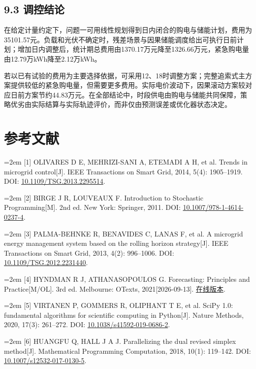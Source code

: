 \documentclass[UTF8,a4paper,zihao=-4,fontset=windows]{ctexart}
\begin{document}
\subsection{9.3 调控结论}
在给定计量约定下，问题一可用线性规划得到日内闭合的购电与储能计划，费用为35101.57元。负载和光伏不确定时，残差场景与因果储能调度给出可执行日前计划；增加日内调整后，统计期总费用由1370.17万元降至1326.66万元，紧急购电量由12.79万kWh降至2.12万kWh。
\par
若以已有试验的费用为主要选择依据，可采用12、18时调整方案；完整追索式主方案提供较低的紧急购电量，但需要更多费用。实际电价波动下，因果滚动方案较对应日前方案节约44.83万元。在全部结论中，时段供电由购电与储能共同保障，策略优劣由实际结算与实际轨迹评价，而非仅由预测误差或优化器状态决定。
\par
\clearpage
\section{参考文献}
{\small\noindent\hangindent=2em [1] OLIVARES D E, MEHRIZI-SANI A, ETEMADI A H, et al. Trends in microgrid control[J]. IEEE Transactions on Smart Grid, 2014, 5(4): 1905–1919. DOI: \href{https://doi.org/10.1109/TSG.2013.2295514}{10.1109/TSG.2013.2295514}.\par}\vspace{4pt}
{\small\noindent\hangindent=2em [2] BIRGE J R, LOUVEAUX F. Introduction to Stochastic Programming[M]. 2nd ed. New York: Springer, 2011. DOI: \href{https://doi.org/10.1007/978-1-4614-0237-4}{10.1007/978-1-4614-0237-4}.\par}\vspace{4pt}
{\small\noindent\hangindent=2em [3] PALMA-BEHNKE R, BENAVIDES C, LANAS F, et al. A microgrid energy management system based on the rolling horizon strategy[J]. IEEE Transactions on Smart Grid, 2013, 4(2): 996–1006. DOI: \href{https://doi.org/10.1109/TSG.2012.2231440}{10.1109/TSG.2012.2231440}.\par}\vspace{4pt}
{\small\noindent\hangindent=2em [4] HYNDMAN R J, ATHANASOPOULOS G. Forecasting: Principles and Practice[M/OL]. 3rd ed. Melbourne: OTexts, 2021[2026-09-13]. \href{https://otexts.com/fpp3/}{在线版本}.\par}\vspace{4pt}
{\small\noindent\hangindent=2em [5] VIRTANEN P, GOMMERS R, OLIPHANT T E, et al. SciPy 1.0: fundamental algorithms for scientific computing in Python[J]. Nature Methods, 2020, 17(3): 261–272. DOI: \href{https://doi.org/10.1038/s41592-019-0686-2}{10.1038/s41592-019-0686-2}.\par}\vspace{4pt}
{\small\noindent\hangindent=2em [6] HUANGFU Q, HALL J A J. Parallelizing the dual revised simplex method[J]. Mathematical Programming Computation, 2018, 10(1): 119–142. DOI: \href{https://doi.org/10.1007/s12532-017-0130-5}{10.1007/s12532-017-0130-5}.\par}\vspace{4pt}
\clearpage
\end{document}
